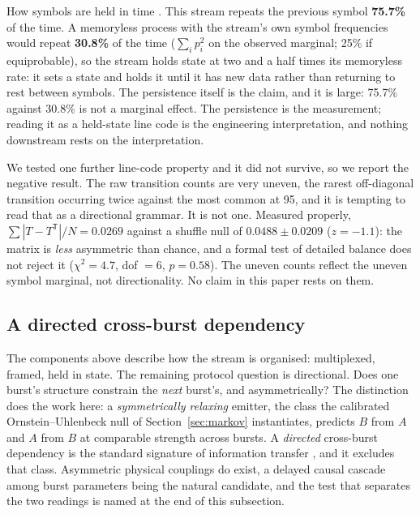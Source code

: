 \documentclass[11pt,a4paper]{article}
\newcommand{\bnum}[1]{\textbf{#1}}
\begin{document}
How symbols are held in time \cite{proakis2008}. This stream repeats the previous symbol
\bnum{75.7\%} of the time. A memoryless process with the stream's own symbol
frequencies would repeat \bnum{30.8\%} of the time ($\sum_i p_i^2$ on the observed
marginal; 25\% if equiprobable), so the stream holds state at two and a half times
its memoryless rate: it sets a
state and holds it until it has new data rather than returning to rest between symbols.
The persistence itself is the claim, and it is large: 75.7\% against 30.8\% is not a
marginal effect. The persistence is the measurement; reading it as a held-state line
code is the engineering interpretation, and nothing downstream rests on the
interpretation.

We tested one further line-code property and it did not survive, so we report the
negative result. The raw transition counts are very uneven, the rarest off-diagonal
transition occurring twice against the most common at 95, and it is tempting to read
that as a directional grammar. It is not one. Measured properly,
$\sum|T - T^{\mathsf{T}}|/N = 0.0269$ against a shuffle null of $0.0488 \pm 0.0209$
($z = -1.1$): the matrix is \emph{less} asymmetric than chance, and a formal test of
detailed balance does not reject it ($\chi^2 = 4.7$, dof $= 6$, $p = 0.58$). The uneven
counts reflect the uneven symbol marginal, not directionality. No claim in this paper
rests on them.

\subsection{A directed cross-burst dependency}
\label{sec:directed}

The components above describe how the stream is organised: multiplexed, framed, held in
state. The remaining protocol question is directional. Does one burst's structure
constrain the \emph{next} burst's, and asymmetrically? The distinction does the work
here: a \emph{symmetrically relaxing} emitter, the class the calibrated
Ornstein--Uhlenbeck null of Section~\ref{sec:markov} instantiates, predicts $B$ from
$A$ and $A$ from $B$ at comparable strength across bursts. A \emph{directed}
cross-burst dependency is the standard signature of information transfer
\cite{schreiber2000}, and it excludes that class. Asymmetric physical couplings do
exist, a delayed causal cascade among burst parameters being the natural candidate,
and the test that separates the two readings is named at the end of this subsection.
\end{document}
